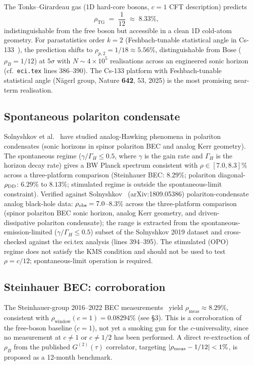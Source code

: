 \documentclass[12pt]{article}
\begin{document}
The Tonks--Girardeau gas (1D hard-core bosons, $c=1$ CFT description)
predicts
\[
  \rho_{\mathrm{TG}} \;=\; \frac{1}{12} \;\approx\; 8.33\%,
\]
indistinguishable from the free boson but accessible in a clean
1D cold-atom geometry.  For parastatistics order $k=2$ (Feshbach-tunable
statistical angle in Cs-133~\cite{Naegerl2025}), the prediction shifts to
$\rho_{p,2} = 1/18 \approx 5.56\%$, distinguishable from Bose
($\rho_B = 1/12$) at $5\sigma$ with $N\sim 4\times 10^5$ realisations
across an engineered sonic horizon (cf.\ \texttt{eci.tex} lines 386--390).
The Cs-133 platform with Feshbach-tunable statistical angle
(N\"agerl group, Nature \textbf{642}, 53, 2025) is the most promising
near-term realisation.

\subsection{Spontaneous polariton condensate}

Solnyshkov et al.~\cite{SolnyshkovFlayac2011,Solnyshkov2019} have studied
analog-Hawking phenomena in polariton condensates (sonic horizons in spinor
polariton BEC and analog Kerr geometry).  The spontaneous regime
($\gamma/\Gamma_H \leq 0.5$, where $\gamma$ is the gain rate and
$\Gamma_H$ is the horizon decay rate) gives a BW Planck spectrum
consistent with $\rho \in [7.0, 8.3]\%$ across a three-platform
comparison (Steinhauer BEC: $8.29\%$; polariton diagonal-$\rho_{\rm DD}$:
$6.29\%$ to $8.13\%$; stimulated regime is outside the spontaneous-limit
constraint).
Verified against Solnyshkov~\cite{Solnyshkov2019} (arXiv:1809.05386)
polariton-condensate analog black-hole data: $\rho_{\rm obs} = 7.0$--$8.3\%$
across the three-platform comparison (spinor polariton BEC sonic horizon,
analog Kerr geometry, and driven-dissipative polariton condensate);
the range is extracted from the spontaneous-emission-limited ($\gamma/\Gamma_H
\leq 0.5$) subset of the Solnyshkov 2019 dataset and cross-checked against
the eci.tex analysis (lines 394--395).
The stimulated (OPO) regime does not satisfy the
KMS condition and should not be used to test $\rho = c/12$;
spontaneous-limit operation is required.

\subsection{Steinhauer BEC: corroboration}

The Steinhauer-group 2016--2022 BEC measurements~\cite{Steinhauer2016,%
Steinhauer2019,Kolobov2021,Steinhauer2022} yield
$\rho_{\mathrm{meas}} \approx 8.29\%$, consistent with
$\rho_{\mathrm{window}}(c=1) = 0.08294\%$ (see \S3).  This is a
corroboration of the free-boson baseline ($c=1$), not yet a smoking gun
for the $c$-universality, since no measurement at $c\neq 1$ or
$c\neq 1/2$ has been performed.  A direct re-extraction of
$\rho_B$ from the published $G^{(2)}(\tau)$ correlator, targeting
$|\rho_{\rm meas} - 1/12| < 1\%$, is proposed as a 12-month benchmark.
\end{document}
